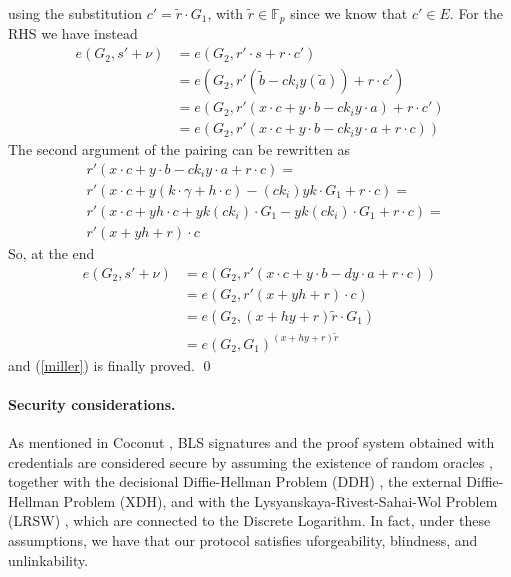 \documentclass[twocolumn]{article}
\begin{document}
using the substitution $c'=\tilde{r}\cdot G_1$, with $\tilde{r}\in\mathbb{F}_p$ since we know that $c'\in E$. For the RHS we have instead
\begin{align*}
    e(G_2, s' + \nu) &= e(G_2, r'\cdot s + r \cdot c') \\
    &= e(G_2, r'(\tilde{b} - ck_i y (\tilde{a})) + r \cdot c') \\
    &= e(G_2, r'(x\cdot c + y\cdot b - ck_i y\cdot a) + r \cdot c') \\
    &= e(G_2, r'(x\cdot c + y\cdot b - ck_i y\cdot a + r \cdot c)) 
\end{align*}
The second argument of the pairing can be rewritten as
\[
\begin{split}
    &r'(x\cdot c + y\cdot b - ck_i y\cdot a + r \cdot c) = \\
    &r'(x\cdot c + y(k\cdot \gamma + h\cdot c) - (ck_i) yk\cdot G_1 + r \cdot c) = \\
    &r'(x\cdot c + yh\cdot c + yk(ck_i)\cdot G_1  - yk(ck_i)\cdot G_1 + r \cdot c) = \\
    &r'(x + yh + r) \cdot c
\end{split}
\]
So, at the end
\[
\begin{split}
    e(G_2, s' + \nu) &= e(G_2, r'(x\cdot c + y\cdot b - dy\cdot a + r \cdot c)) \\
    &= e(G_2, r'(x + yh + r) \cdot c) \\
    &= e(G_2,(x+hy+r)\tilde{r}\cdot G_1) \\
    &= e(G_2,G_1)^{(x+hy+r)\tilde{r}}
\end{split}
\]
and (\ref{miller}) is finally proved. 
\qed

\paragraph{Security considerations.} 

As mentioned in Coconut \citep{coconut-2018}, BLS signatures and the proof system obtained with credentials are considered secure by assuming the existence of random oracles \citep{random-oracle}, together with the decisional Diffie-Hellman Problem (DDH) \citep{DDH-problem}, the external Diffie-Hellman Problem (XDH), and with the Lysyanskaya-Rivest-Sahai-Wol Problem (LRSW) \citep{lrsw-assumption}, which are connected to the Discrete Logarithm. In fact, under these assumptions, we have that our protocol satisfies uforgeability, blindness, and unlinkability.

\pagebreak
\end{document}
